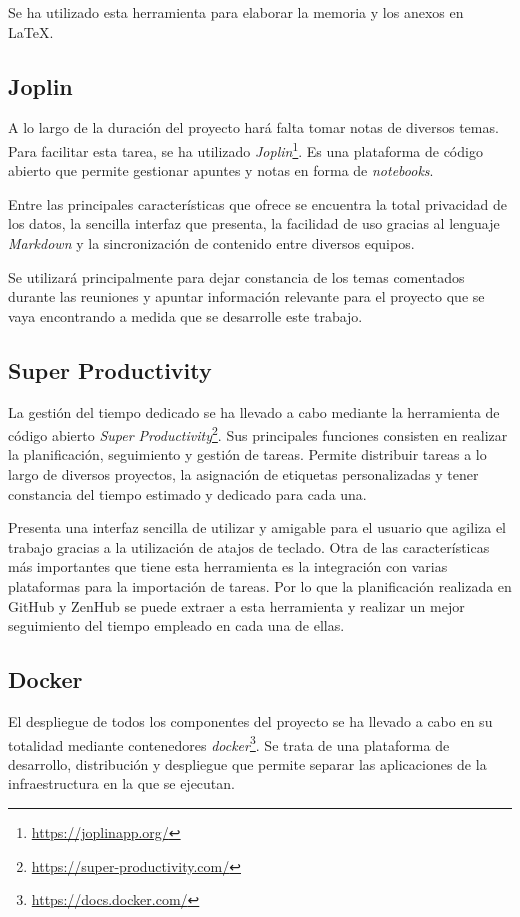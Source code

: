 Se ha utilizado esta herramienta para elaborar la memoria y los anexos en \LaTeX{}.

\subsection{Joplin}
A lo largo de la duración del proyecto hará falta tomar notas de diversos temas. Para facilitar esta tarea, se ha utilizado \textit{Joplin}\footnote{\url{https://joplinapp.org/}}. Es una plataforma de código abierto que permite gestionar apuntes y notas en forma de \textit{notebooks}.

Entre las principales características que ofrece se encuentra la total privacidad de los datos, la sencilla interfaz que presenta, la facilidad de uso gracias al lenguaje \textit{Markdown} y la sincronización de contenido entre diversos equipos.

Se utilizará principalmente para dejar constancia de los temas comentados durante las reuniones y apuntar información relevante para el proyecto que se vaya encontrando a medida que se desarrolle este trabajo.

\subsection{Super Productivity}
La gestión del tiempo dedicado se ha llevado a cabo mediante la herramienta de código abierto \textit{Super Productivity}\footnote{\url{https://super-productivity.com/}}. Sus principales funciones consisten en realizar la planificación, seguimiento y gestión de tareas. Permite distribuir tareas a lo largo de diversos proyectos, la asignación de etiquetas personalizadas y tener constancia del tiempo estimado y dedicado para cada una. 

Presenta una interfaz sencilla de utilizar y amigable para el usuario que agiliza el trabajo gracias a la utilización de atajos de teclado. Otra de las características más importantes que tiene esta herramienta es la integración con varias plataformas para la importación de tareas. Por lo que la planificación realizada en GitHub y ZenHub se puede extraer a esta herramienta y realizar un mejor seguimiento del tiempo empleado en cada una de ellas.

\subsection{Docker}

El despliegue de todos los componentes del proyecto se ha llevado a cabo en su totalidad mediante contenedores \textit{docker}\footnote{\url{https://docs.docker.com/}}. Se trata de una plataforma de desarrollo, distribución y despliegue que permite separar las aplicaciones de la infraestructura en la que se ejecutan.


